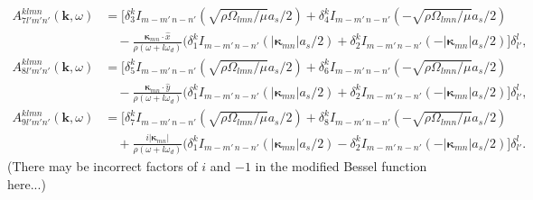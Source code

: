\documentclass[aps,pre,amsmath,amssymb,floatfix,onecolumn,notitlepage,10pt]{revtex4-1}
\begin{document}
\begin{align}
A^{klmn}_{7l'm'n'}(\mathbf{k}, \omega) &= \Big[ \delta^k_{3} I_{m-m'\, n-n'} (\sqrt{\rho\Omega_{lmn}/\mu}a_s/2)  + \delta^k_{4} I_{m-m'\, n-n'} (-\sqrt{\rho\Omega_{lmn}/\mu}a_s/2) \label{lnoslip1}  \nonumber  \\
&\quad - \frac{\bm{\kappa}_{mn}\cdot \hat{x}}{\rho(\omega+l\omega_d)}(\delta^k_{1} I_{m-m'\, n-n'} (|\bm{\kappa}_{mn}|a_s/2) + \delta^k_{2} I_{m-m'\, n-n'} (-|\bm{\kappa}_{mn}|a_s/2) \Big]\delta^l_{l'},  \\
A^{klmn}_{8l'm'n'}(\mathbf{k}, \omega) &= \Big[ \delta^k_{5} I_{m-m'\, n-n'} (\sqrt{\rho\Omega_{lmn}/\mu}a_s/2)  + \delta^k_{6} I_{m-m'\, n-n'} (-\sqrt{\rho\Omega_{lmn}/\mu}a_s/2)  \nonumber \\
&\quad - \frac{\bm{\kappa}_{mn}\cdot \hat{y}}{\rho(\omega+l\omega_d)}(\delta^k_{1} I_{m-m'\, n-n'} (|\bm{\kappa}_{mn}|a_s/2) + \delta^k_{2} I_{m-m'\, n-n'} (-|\bm{\kappa}_{mn}|a_s/2) \Big]\delta^l_{l'},   \label{lnoslip2} \\
A^{klmn}_{9l'm'n'}(\mathbf{k}, \omega) &= \Big[ \delta^k_{7} I_{m-m'\, n-n'} (\sqrt{\rho\Omega_{lmn}/\mu}a_s/2)  + \delta^k_{8} I_{m-m'\, n-n'} (-\sqrt{\rho\Omega_{lmn}/\mu}a_s/2) \nonumber \\
&\quad + \frac{i|\bm{\kappa}_{mn}|}{\rho(\omega+l\omega_d)}(\delta^k_{1} I_{m-m'\, n-n'} (|\bm{\kappa}_{mn}|a_s/2) - \delta^k_{2} I_{m-m'\, n-n'} (-|\bm{\kappa}_{mn}|a_s/2) \Big]\delta^l_{l'}. \label{lnoslip3}
\end{align}
(There may be incorrect factors of $i$ and $-1$ in the modified Bessel function here...)
\end{document}

